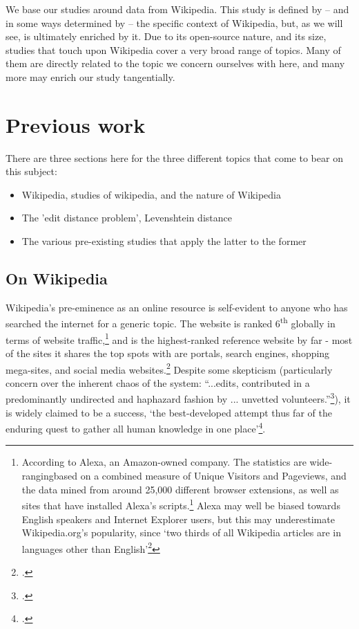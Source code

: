 \documentclass[a4paper,11pt,twoside,notitlepage]{article}
\newcommand{\super}[1]{\textsuperscript{#1}}
\renewcommand{\cite}[1]{\footcite{#1}}
\begin{document}
        We base our studies around data from Wikipedia. This study is
        defined by -- and in some ways determined by -- the specific
        context of Wikipedia, but, as we will see, is ultimately
        enriched by it. Due to its open-source nature, and its size,
        studies that touch upon Wikipedia cover a very broad range of
        topics. Many of them are directly related to the topic we
        concern ourselves with here, and many more may enrich our
        study tangentially. 
 
        \section{Previous work}
        There are three sections here for the three different topics
        that come to bear on this subject:
        \begin{itemize}
          \item Wikipedia, studies of wikipedia, and the nature of
            Wikipedia
          \item The 'edit distance problem', Levenshtein distance
          \item The various pre-existing studies that apply the latter
            to the former
        \end{itemize}
        
        \subsection{On Wikipedia}
        Wikipedia's pre-eminence as an online resource is self-evident
        to anyone who has searched the internet for a generic
        topic. The website is ranked 6\super{th} globally in terms of
        website traffic,\footnote{According to Alexa, an Amazon-owned
          company. The statistics are wide-rangingbased on a combined
          measure of Unique Visitors and Pageviews, and the data mined
          from around 25,000 different browser extensions, as well as
          sites that have installed Alexa's
          scripts.\cite{Alexa-about2014} Alexa may well be biased
          towards English speakers and Internet Explorer users, but
          this may underestimate Wikipedia.org's popularity, since
          `two thirds of all Wikipedia articles are in languages other
          than English'\cite{wikimedia-noteonalexa}} and is the
        highest-ranked reference website by far - most of the sites it
        shares the top spots with are portals, search engines,
        shopping mega-sites, and social media
        websites.\cite{Alexa-topsites2014} Despite some skepticism
        (particularly concern over the inherent chaos of the system:
        ``...edits, contributed in a predominantly undirected and
        haphazard fashion by ... unvetted
        volunteers.''\cite{Wilkinson2007}), it is widely
        claimed to be a success, `the best-developed attempt thus
        far of the enduring quest to gather all human knowledge in one
        place'\cite{Mesgari2014}.
\end{document}
